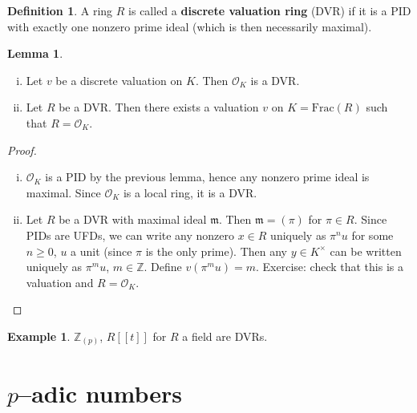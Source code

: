 \documentclass{article}
\theoremstyle{definition}
\newtheorem{lemma}[theorem]{Lemma}
\newtheorem{example}{Example}[section]
\newtheorem{defn}{Definition}[section]
\begin{document}
\begin{defn}
    A ring $R$ is called a \textbf{discrete valuation ring} (DVR) if it is a PID with exactly one nonzero prime ideal (which is then necessarily maximal).
\end{defn}
\begin{lemma}
    \begin{enumerate}[(i)]
        \item Let $v$ be a discrete valuation on $K$. Then $\mathcal{O}_K$ is a DVR.
        \item Let $R$ be a DVR. Then there exists a valuation $v$ on $K = \text{Frac}(R)$ such that $R = \mathcal{O}_K$.
    \end{enumerate}
\end{lemma}
\begin{proof}
    \begin{enumerate}[(i)]
        \item $\mathcal{O}_K$ is a PID by the previous lemma, hence any nonzero prime ideal is maximal. Since $\mathcal{O}_K$ is a local ring, it is a DVR.
        \item Let $R$ be a DVR with maximal ideal $\mathfrak{m}$. Then $\mathfrak{m} = (\pi)$ for $\pi \in R$. Since PIDs are UFDs, we can write any nonzero $x \in R$ uniquely as $\pi^n u$ for some $n \ge 0$, $u$ a unit (since $\pi$ is the only prime). Then any $y \in K^{\times}$ can be written uniquely as $\pi^m u$, $m \in \mathbb{Z}$. Define $v(\pi^m u) = m$. Exercise: check that this is a valuation and $R = \mathcal{O}_K$.
    \end{enumerate}
\end{proof}
\begin{example}
    $\mathbb{Z}_{(p)}$, $R[[t]]$ for $R$ a field are DVRs.
\end{example}

\section{$p$--adic numbers}
\end{document}
